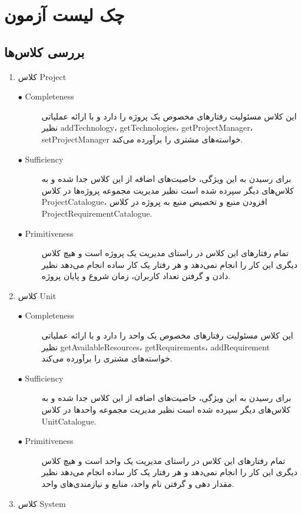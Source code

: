 \chapter{چک لیست  آزمون}

\section{بررسی کلاس‌ها}
\begin{enumerate}
\item کلاس Project

\begin{description}
\item[$\bullet$ Completeness]  این کلاس مسئولیت رفتارهای مخصوص یک پروژه را دارد و با ارائه عملیاتی نظیر addTechnology، getTechnologies، getProjectManager، setProjectManager خواسته‌های مشتری را برآورده می‌کند.
\par
\item[$\bullet$ Sufficiency] برای رسیدن به این ویژگی، خاصیت‌های اضافه از این کلاس جدا شده و به کلاس‌های دیگر سپرده شده است نظیر مدیریت مجموعه پروژه‌ها در کلاس ProjectCatalogue، افزودن منبع و تخصیص منبع به پروژه در کلاس ProjectRequirementCatalogue.
\par
\item[$\bullet$ Primitiveness] تمام رفتارهای این کلاس در راستای مدیریت یک پروژه است و هیچ کلاس دیگری این کار را انجام نمی‌دهد و هر رفتار یک کار ساده انجام می‌دهد نظیر دادن و گرفتن تعداد کاربران، زمان شروع و پایان پروژه.
\end{description}

\item کلاس Unit
\begin{description}
\item[$\bullet$ Completeness]  این کلاس مسئولیت رفتارهای مخصوص یک واحد را دارد و با ارائه عملیاتی نظیر getAvailableResources، getRequirements، addRequirement خواسته‌های مشتری را برآورده می‌کند.
\par
\item[$\bullet$ Sufficiency] برای رسیدن به این ویژگی، خاصیت‌های اضافه از این کلاس جدا شده و به کلاس‌های دیگر سپرده شده است نظیر مدیریت مجموعه واحدها در کلاس UnitCatalogue.
\par
\item[$\bullet$ Primitiveness] تمام رفتارهای این کلاس در راستای مدیریت یک واحد است و هیچ کلاس دیگری این کار را انجام نمی‌دهد و هر رفتار یک کار ساده انجام می‌دهد نظیر مقدار دهی و گرفتن نام واحد، منابع و نیازمندی‌های واحد.
\end{description}
\item کلاس System


\end{enumerate}
